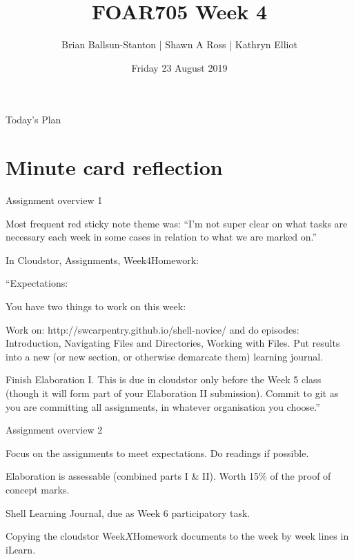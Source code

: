\documentclass[aspectratio=1610, 11pt]{beamer} %
\title{FOAR705 Week 4} %
\author{Brian Ballsun-Stanton | Shawn A Ross | Kathryn Elliot}               %
\institute{Faculty of Arts}         %
\date{Friday 23 August 2019}                 %
\begin{document}

\maketitle

  

\begin{frame}{Today's Plan}
  \tableofcontents
\end{frame}

\section{Minute card reflection}
\begin{frame}{Assignment overview 1}

Most frequent red sticky note theme was: ``I'm not super clear on what tasks are necessary each week in some cases in relation to what we are marked on.'' 

In Cloudstor, Assignments, Week4Homework:

``Expectations:

You have two things to work on this week:

Work on: http://swcarpentry.github.io/shell-novice/ and do episodes: Introduction, Navigating Files and Directories, Working with Files. Put results into a new (or new section, or otherwise demarcate them) learning journal.

Finish Elaboration I. This is due in cloudstor only before the Week 5 class (though it will form part of your Elaboration II submission). Commit to git as you are committing all assignments, in whatever organisation you choose.''

\end{frame}

\begin{frame}{Assignment overview 2}

Focus on the assignments to meet expectations. Do readings if possible. 

Elaboration is assessable (combined parts I & II). Worth 15\% of the proof of concept marks. 

Shell Learning Journal, due as Week 6 participatory task.

Copying the cloudstor Week$X$Homework documents to the week by week lines in iLearn. 

\end{frame}
\end{document}
